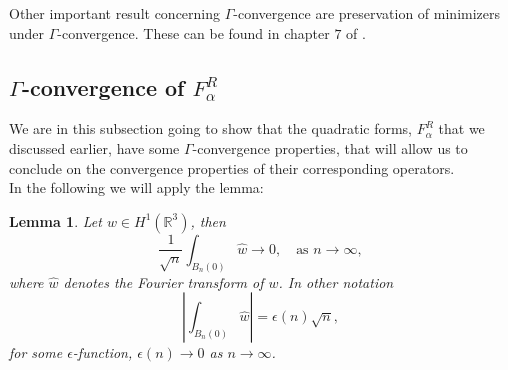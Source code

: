 \documentclass[a4paper,11pt]{article}
\newcommand{\R}{\mathbb{R}}
\newtheorem{lemma}{Lemma}
\numberwithin{equation}{section}
\begin{document}
Other important result concerning $ \Gamma $-convergence are preservation of minimizers under $ \Gamma $-convergence. These can be found in chapter $ 7 $ of \cite{maso1993introduction}.
\subsection{$ \Gamma $-convergence of $ F_\alpha^R $}
We are in this subsection going to show that the quadratic forms, $ F_\alpha^R $ that we discussed earlier, have some $ \Gamma $-convergence properties, that will allow us to conclude on the convergence properties of their corresponding operators.\\
In the following we will apply the lemma:\begin{lemma}\label{H1 int}
	Let $ w\in H^1(\R^3) $, then \begin{equation}
	 \frac{1}{\sqrt{n}}\int_{B_n(0)}\hat{w}\to0,\quad \text{as }n\to\infty,
	\end{equation}
	where $ \hat{w} $ denotes the Fourier transform of $ w $. In other notation \begin{equation}
	\left\lvert\int_{B_n(0)}\hat{w}\right\rvert=\epsilon(n)\sqrt{n},
	\end{equation}
	for some $ \epsilon $-function, $ \epsilon(n)\to0 $ as $ n\to\infty $.
\end{lemma}
\end{document}
